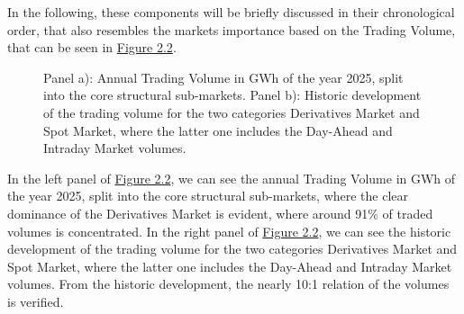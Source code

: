 \documentclass[12pt,a4paper]{cau_thesis}
\begin{document}
In the following, these components will be briefly discussed in their
chronological order, that also resembles the markets importance based
on the Trading Volume, that can be seen in
\hyperref[fig:european_power_market_volumes]{Figure 2.2}.
\begin{figure}[htbp]
    \vspace*{0.5cm}
    \centering
    \footnotesize{Panel a): Annual Trading Volume in GWh of the year 2025, split into the core structural sub-markets. Panel b): Historic development of the trading volume for the two categories Derivatives Market and Spot Market, where the latter one includes the Day-Ahead and Intraday Market volumes.}
    \label{fig:european_power_market_volumes}
\end{figure}
In the left panel of
\hyperref[fig:european_power_market_volumes]{Figure 2.2}, we can see
the annual Trading Volume in GWh of the year 2025, split into the
core structural sub-markets, where the clear dominance of the
Derivatives Market is evident, where around 91\% of traded volumes is
concentrated. In the right panel of
\hyperref[fig:european_power_market_volumes]{Figure 2.2}, we can see
the historic development of the trading volume for the two categories
Derivatives Market and Spot Market, where the latter one includes the
Day-Ahead and Intraday Market volumes. From the historic development,
the nearly 10:1 relation of the volumes is verified.
\end{document}
